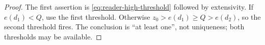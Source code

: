 \begin{proof}
The first assertion is \eqref{eq:reader-high-threshold} followed by
extensivity.  If $e(d_1)<Q$, use the first threshold.  Otherwise
$z_0>e(d_1)\ge Q>e(d_2)$, so the second threshold fires.  The conclusion is
``at least one'', not uniqueness; both thresholds may be available.
\end{proof}
